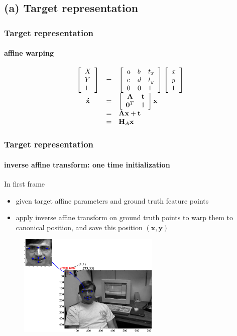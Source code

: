 \subsection{(a) Target representation}
\begin{frame}
\frametitle{Target representation}
\framesubtitle{affine warping}
\logoCSIPCPL\mypagenum
\begin{equation*}
\begin{array}{cllll}
\left[\begin{array}{l}X\\Y\\1\end{array}\right]   &=& \left[ \begin{array}{lll} a &b & t_x \\ c & d & t_y \\ 0 & 0 & 1 \\ \end{array} \right] \left[\begin{array}{l}x\\y\\1\end{array}\right]\\
\mathbf{\acute{x}} &=& \left[\begin{array}{cccc}\mathbf{A} & \mathbf{t}\\\mathbf{0}^T & 1\end{array}\right] \mathbf{x}\\
&=& \mathbf{A}\mathbf{x} + \mathbf{t}\\
&=& \mathbf{H}_A \mathbf{x}\\
\end{array}
\label{Eqn:top_level}
\end{equation*}
\end{frame}



\begin{frame}
\frametitle{Target representation}
\framesubtitle{inverse affine transform: one time initialization}
\logoCSIPCPL\mypagenum
In first frame
\begin{itemize}
\item given target affine parameters and ground truth feature points
\item apply inverse affine transform on ground truth points to warp them to canonical position, and save this position $(\mathbf{x, y})$
\end{itemize}
\begin{figure}[t]
\centering
\includegraphics[width=0.6\textwidth]{thesis/dataset_Dudek_00001_inverseAffine.pdf}
\label{fig:original_feature_points}
\end{figure}
\end{frame}




